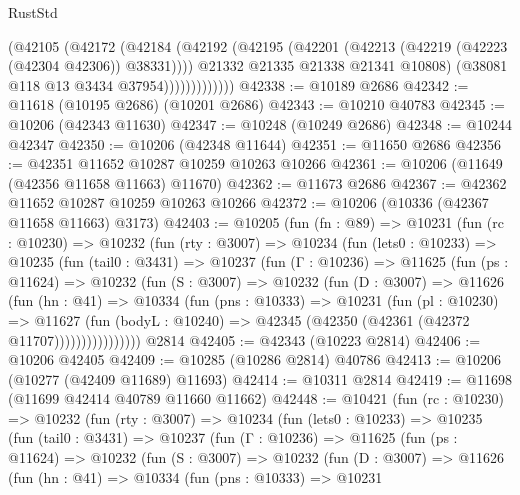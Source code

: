 \begin{lexlean}{RustStd}
\begin{coremodule}
                      (@42105
                        (@42172
                          (@42184
                            (@42192
                              (@42195 (@42201 (@42213 (@42219 (@42223 (@42304 @42306)) @38331))))
                              @21332
                              @21335
                              @21338
                              @21341
                              @10808)
                            (@38081 @118 @13 @3434 @37954)))))))))))))
@42338 := @10189 @2686
@42342 := @11618 (@10195 @2686) (@10201 @2686)
@42343 := @10210 @40783
@42345 := @10206 (@42343 @11630)
@42347 := @10248 (@10249 @2686)
@42348 := @10244 @42347
@42350 := @10206 (@42348 @11644)
@42351 := @11650 @2686
@42356 := @42351 @11652 @10287 @10259 @10263 @10266
@42361 := @10206 (@11649 (@42356 @11658 @11663) @11670)
@42362 := @11673 @2686
@42367 := @42362 @11652 @10287 @10259 @10263 @10266
@42372 := @10206 (@10336 (@42367 @11658 @11663) @3173)
@42403 := @10205
    (fun (fn : @89) =>
    @10231
      (fun (rc : @10230) =>
      @10232
        (fun (rty : @3007) =>
        @10234
          (fun (lets0 : @10233) =>
          @10235
            (fun (tail0 : @3431) =>
            @10237
              (fun (Γ : @10236) =>
              @11625
                (fun (ps : @11624) =>
                @10232
                  (fun (S : @3007) =>
                  @10232
                    (fun (D : @3007) =>
                    @11626
                      (fun (hn : @41) =>
                      @10334
                        (fun (pns : @10333) =>
                        @10231
                          (fun (pl : @10230) =>
                          @11627
                            (fun (bodyL : @10240) =>
                            @42345 (@42350 (@42361 (@42372 @11707))))))))))))))))
    @2814
@42405 := @42343 (@10223 @2814)
@42406 := @10206 @42405
@42409 := @10285 (@10286 @2814) @40786
@42413 := @10206 (@10277 (@42409 @11689) @11693)
@42414 := @10311 @2814
@42419 := @11698 (@11699 @42414 @40789 @11660 @11662)
@42448 := @10421
    (fun (rc : @10230) =>
    @10232
      (fun (rty : @3007) =>
      @10234
        (fun (lets0 : @10233) =>
        @10235
          (fun (tail0 : @3431) =>
          @10237
            (fun (Γ : @10236) =>
            @11625
              (fun (ps : @11624) =>
              @10232
                (fun (S : @3007) =>
                @10232
                  (fun (D : @3007) =>
                  @11626
                    (fun (hn : @41) =>
                    @10334
                      (fun (pns : @10333) =>
                      @10231

\end{coremodule}
\end{lexlean}
